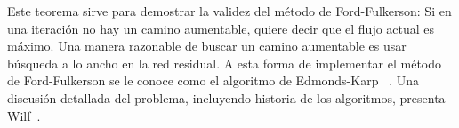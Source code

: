   Este teorema sirve para demostrar
  la validez del método de Ford-Fulkerson:%
  Si en una iteración
  no hay un camino aumentable,
  quiere decir que el flujo actual es máximo.
  Una manera razonable
  de buscar un camino aumentable
  es usar búsqueda a lo ancho en la red residual.
  A esta forma de implementar el método de Ford-Fulkerson
  se le conoce como el algoritmo de Edmonds-Karp~%
    \cite{edmonds72:_theor_improv_algor_effic_networ_flow_probl}.%
  Una discusión detallada del problema,
  incluyendo historia de los algoritmos,
  presenta Wilf~\cite[capítulo~3]{wilf03:_algor_compl}.


